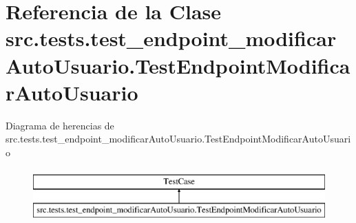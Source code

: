 \hypertarget{classsrc_1_1tests_1_1test__endpoint__modificar_auto_usuario_1_1_test_endpoint_modificar_auto_usuario}{\section{Referencia de la Clase src.\-tests.\-test\-\_\-endpoint\-\_\-modificar\-Auto\-Usuario.\-Test\-Endpoint\-Modificar\-Auto\-Usuario}
\label{classsrc_1_1tests_1_1test__endpoint__modificar_auto_usuario_1_1_test_endpoint_modificar_auto_usuario}
}
Diagrama de herencias de src.\-tests.\-test\-\_\-endpoint\-\_\-modificar\-Auto\-Usuario.\-Test\-Endpoint\-Modificar\-Auto\-Usuario\begin{figure}[H]
\begin{center}
\leavevmode
\includegraphics[height=2.000000cm]{classsrc_1_1tests_1_1test__endpoint__modificar_auto_usuario_1_1_test_endpoint_modificar_auto_usuario}
\end{center}
\end{figure}
